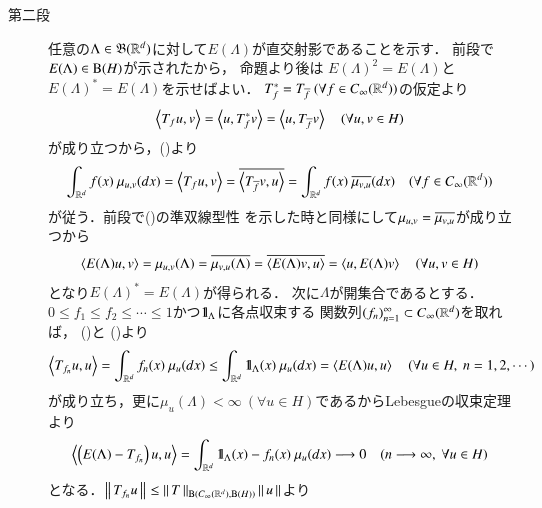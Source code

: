 \begin{prf}
\begin{description}
			\item[第二段] 任意の$\Lambda \in \mathfrak{B}(\mathbb{R}^d)$に対して$E(\Lambda)$が直交射影であることを示す．
				前段で$E(\Lambda) \in \mathrm{B}(H) $が示されたから，
				命題\label{prp:orthogonal_projection_idempotent_self_adjoint}より後は
				$E(\Lambda)^2 = E(\Lambda)$と$E(\Lambda)^* = E(\Lambda)$を示せばよい．
				$T_f^* = T_{\overline{f}}\ (\forall f \in C_\infty (\mathbb{R}^d))$の仮定より
				\begin{align}
					\inprod<T_f u,v> = \inprod<u,T_f^*v> = \inprod<u,T_{\conj{f}}v> \quad (\forall u,v \in H)
				\end{align}
				が成り立つから，()より
				\begin{align}
					\int_{\R^d} f(x)\ \mu_{u,v}(dx) = \inprod<T_f u,v> = \conj{\inprod<T_{\conj{f}}v,u>}
					= \int_{\R^d} f(x)\ \conj{\mu_{v,u}}(dx)
					\quad (\forall f \in \cvan{\R^d})
				\end{align}
				が従う．前段で()の準双線型性
				を示した時と同様にして$\mu_{u,v} = \overline{\mu_{v,u}}$が成り立つから
				\begin{align}
					\inprod<E(\Lambda)u,v> = \mu_{u,v}(\Lambda)
					= \conj{\mu_{v,u}(\Lambda)}
					= \conj{\inprod<E(\Lambda)v,u>}
					= \inprod<u,E(\Lambda)v>
					\quad (\forall u,v \in H)
				\end{align}
				となり$E(\Lambda)^* = E(\Lambda)$が得られる．
				次に$\Lambda$が開集合であるとする．
				$0 \leq f_1 \leq f_2 \leq \cdots \leq 1$かつ$\mbox{1}\hspace{-0.25em}\mbox{l}_\Lambda$に各点収束する
				関数列$(f_n)_{n=1}^{\infty} \subset C_\infty (\mathbb{R}^d)$を取れば，
				()と
				()より
				\begin{align}
					\inprod<T_{f_n}u,u> = \int_{\R^d} f_n(x)\ \mu_u(dx)
					\leq \int_{\R^d} \defunc_\Lambda(x)\ \mu_u(dx) = \inprod<E(\Lambda)u,u>
					\quad (\forall u \in H,\ n=1,2,\cdots)
				\end{align}
				が成り立ち，更に$\mu_u(\Lambda) < \infty\ (\forall u \in H)$であるからLebesgueの収束定理より
				\begin{align}
					\inprod<\left( E(\Lambda) - T_{f_n} \right)u,u>
					= \int_{\R^d} \defunc_{\Lambda}(x) - f_n(x)\ \mu_u(dx) 
					\longrightarrow 0 \quad (n \longrightarrow \infty,\ \forall u \in H)
				\end{align}
				となる．$\left\|\, T_{f_n} u\, \right\|_{} \leq \left\|\, T\, \right\|_{\mathrm{B}(C_\infty (\mathbb{R}^d),\mathrm{B}(H) ) } \left\|\, u\, \right\|_{}$より

\end{description}
\end{prf}

